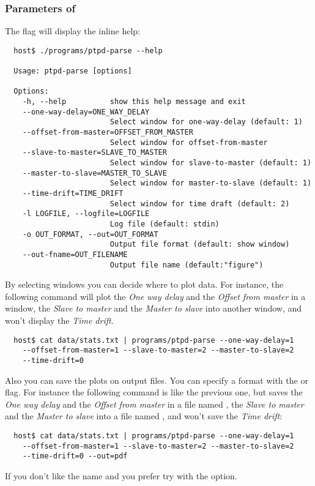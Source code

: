         \subsubsection{Parameters of }

            The  flag will display the inline help:
\begin{lstlisting}
  host$ ./programs/ptpd-parse --help

  Usage: ptpd-parse [options]

  Options:
    -h, --help          show this help message and exit
    --one-way-delay=ONE_WAY_DELAY
                        Select window for one-way-delay (default: 1)
    --offset-from-master=OFFSET_FROM_MASTER
                        Select window for offset-from-master
    --slave-to-master=SLAVE_TO_MASTER
                        Select window for slave-to-master (default: 1)
    --master-to-slave=MASTER_TO_SLAVE
                        Select window for master-to-slave (default: 1)
    --time-drift=TIME_DRIFT
                        Select window for time draft (default: 2)
    -l LOGFILE, --logfile=LOGFILE
                        Log file (default: stdin)
    -o OUT_FORMAT, --out=OUT_FORMAT
                        Output file format (default: show window)
    --out-fname=OUT_FILENAME
                        Output file name (default:"figure")
\end{lstlisting}

            By selecting windows you can decide where to plot data. For
            instance, the following command will plot the \emph{One way
            delay} and the \emph{Offset from master} in a window,
            the \emph{Slave to master} and the \emph{Master to slave} into
            another window, and won't display the \emph{Time drift}.
\begin{lstlisting}
  host$ cat data/stats.txt | programs/ptpd-parse --one-way-delay=1
    --offset-from-master=1 --slave-to-master=2 --master-to-slave=2
    --time-drift=0
\end{lstlisting}

            Also you can save the plots on output files. You can specify a
            format with the  or  flag. For instance
            the following command is like the previous one, but saves
            the \emph{One way delay} and the \emph{Offset from master} in
            a file named , the \emph{Slave to
            master} and the \emph{Master to slave} into a file named
            , and won't save the \emph{Time
            drift}:
\begin{lstlisting}
  host$ cat data/stats.txt | programs/ptpd-parse --one-way-delay=1
    --offset-from-master=1 --slave-to-master=2 --master-to-slave=2
    --time-drift=0 --out=pdf
\end{lstlisting}
            If you don't like the name  and you
            prefer  try with the
             option.

